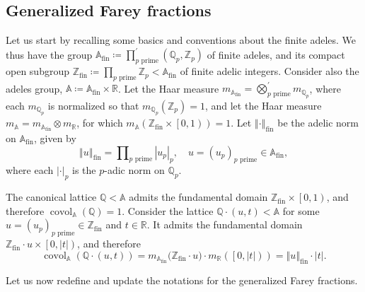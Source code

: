 \documentclass{amsart}
\numberwithin{equation}{subsection}
\theoremstyle{remark}
\begin{document}
\subsection{Generalized Farey fractions}\label{sct:gff}

Let us start by recalling some basics and conventions about the finite adeles. We thus have the group \(\mathbb{A}_{\mathrm{fin}}\coloneqq\prod_{p\text{ prime}}^{\prime}\left(\mathbb{Q}_{p},\mathbb{Z}_{p}\right)\) of finite adeles, and its compact open subgroup \(\mathbb{Z}_{\mathrm{fin}}\coloneqq\prod_{p\text{ prime}}\mathbb{Z}_{p}<\mathbb{A}_{\mathrm{fin}}\) of finite adelic integers. Consider also the adeles group, \(\mathbb{A}\coloneqq\mathbb{A}_{\mathrm{fin}}\times\mathbb{R}\). Let the Haar measure \(m_{\mathbb{A}_{\mathrm{fin}}}=\bigotimes_{p\text{ prime}}^{\prime}m_{\mathbb{Q}_{p}}\), where each \(m_{\mathbb{Q}_{p}}\) is normalized so that \(m_{\mathbb{Q}_{p}}\left(\mathbb{Z}_{p}\right)=1\), and let the Haar measure \(m_{\mathbb{A}}=m_{\mathbb{A}_{\mathrm{fin}}}\otimes m_{\mathbb{R}}\), for which \(m_{\mathbb{A}}\left(\mathbb{Z}_{\mathrm{fin}}\times\left[0,1\right)\right)=1\). Let \(\left\Vert\cdot\right\Vert_{\mathrm{fin}}\) be the adelic norm on \(\mathbb{A}_{\mathrm{fin}}\), given by
\[\left\Vert u\right\Vert_{\mathrm{fin}}=\prod\nolimits_{p\text{ prime}}\left|u_{p}\right|_{p},\quad u=\left(u_{p}\right)_{p\text{ prime}}\in\mathbb{A}_{\mathrm{fin}},\]
where each \(\left|\cdot\right|_{p}\) is the \(p\)-adic norm on \(\mathbb{Q}_{p}\).

The canonical lattice \(\mathbb{Q}<\mathbb{A}\) admits the fundamental domain \(\mathbb{Z}_{\mathrm{fin}}\times\left[0,1\right)\), and therefore \(\operatorname{covol}_{\mathbb{A}}\left(\mathbb{Q}\right)=1\). Consider the lattice \(\mathbb{Q}\cdot\left(u,t\right)<\mathbb{A}\) for some \(u=\left(u_{p}\right)_{p\text{ prime}}\in\mathbb{Z}_{\mathrm{fin}}\) and \(t\in\mathbb{R}\). It admits the fundamental domain \(\mathbb{Z}_{\mathrm{fin}}\cdot u\times\left[0,\left|t\right|\right)\), and therefore
\[\operatorname{covol}_{\mathbb{A}}\left(\mathbb{Q}\cdot\left(u,t\right)\right)=m_{\mathbb{A}_{\mathrm{fin}}}\big(\mathbb{Z}_{\mathrm{fin}}\cdot u\big)\cdot m_{\mathbb{R}}\left(\left[0,\left|t\right|\right)\right)=\left\Vert u\right\Vert_{\mathrm{fin}}\cdot\left|t\right|.\]

Let us now redefine and update the notations for the generalized Farey fractions.
\end{document}
